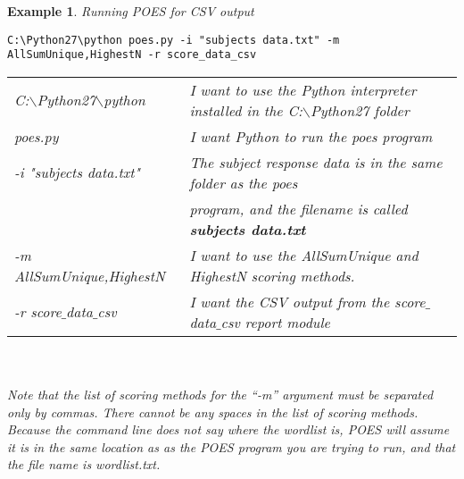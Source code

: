 \documentclass[11pt]{article}
\newcommand{\bsl}{$\backslash$}
\numberwithin{figure}{section}
\numberwithin{table}{section}
\newtheorem{example}{Example}[section]
\begin{document}
\begin{example}{Running POES for CSV output}
\label{ex:withquotes}
\small
\begin{verbatim}
C:\Python27\python poes.py -i "subjects data.txt" -m AllSumUnique,HighestN -r score_data_csv
\end{verbatim}
\begin{tabular}{ll}
C:\bsl{}Python27\bsl{}python & I want to use the Python interpreter installed in the C:\bsl{}Python27 folder\\
poes.py	 & I want Python to run the poes program\\
-i "subjects data.txt" 	& The subject response data is in the same folder as the poes \\
& program, and the filename is called \textbf{subjects data.txt}\\
-m AllSumUnique,HighestN & I want to use the AllSumUnique and HighestN scoring methods.\\
-r score$\_$data$\_$csv	& I want the CSV output from the score$\_$data$\_$csv report module\\
\end{tabular}
\\~\\Note that the list of scoring methods for the ``-m'' argument must be separated only by commas.  There cannot be any spaces in the list of scoring methods.  Because the command line does not say where the wordlist is, POES will assume it is in the same location as as the POES program you are trying to run, and that the file name is wordlist.txt.  
\end{example}
\end{document}
